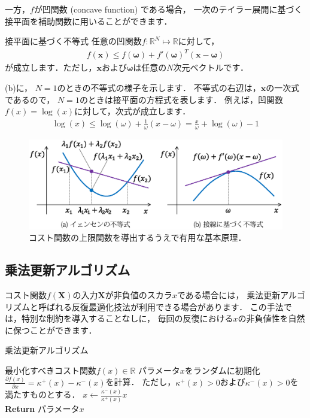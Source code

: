 一方，$f$が凹関数 (concave function) である場合，
一次のテイラー展開に基づく接平面を補助関数に用いることができます．
\begin{theobox}{接平面に基づく不等式}
\label{jensen}
任意の凹関数$f:\mathbb{R}^N \mapsto \mathbb{R}$に対して，
\begin{align}
f(\bm{x}) \le f(\bm\omega) + f'(\bm\omega)^T(\bm{x} - \bm\omega)
\end{align}
が成立します．ただし，$\bm{x}$および$\bm\omega$は任意の$N$次元ベクトルです．\\[-4mm]
\end{theobox}
(b)に，
$N=1$のときの不等式の様子を示します．
不等式の右辺は，$\bm{x}$の一次式であるので，
$N=1$のときは接平面の方程式を表します．
例えば，凹関数$f(x) = \log (x)$に対して，次式が成立します．
\begin{align}
\log(x) \le \log(\omega) + \frac{1}{\omega}(x - \omega) = \frac{x}{\omega} + \log(\omega) - 1
\end{align}

\begin{figure}[t]
\centering
\includegraphics[width=.98\linewidth]{sections/optimization/aux_function_conv_concave}
\vspace{-2mm}
\caption{コスト関数の上限関数を導出するうえで有用な基本原理．}
\label{fig:aux_function_conv_concave}
\end{figure}

\subsection{乗法更新アルゴリズム}
\label{sec:multiplicative_update}

コスト関数$f(\bm{X})$の入力$\bm{X}$が非負値のスカラ$x$である場合には，
乗法更新アルゴリズムと呼ばれる反復最適化技法が利用できる場合があります．
この手法では，特別な制約を導入することなしに，
毎回の反復における$x$の非負値性を自然に保つことができます．

\begin{algobox}{乗法更新アルゴリズム}
\label{algo:multiplicative_update}
\begin{algorithmic}[1]
\Require 最小化すべきコスト関数$f(x) \in \mathbb{R}$
\State パラメータ$x$をランダムに初期化
\State $\frac{\partial f(x)}{\partial x} = \kappa^+(x) - \kappa^-(x)$を計算．
ただし，$\kappa^+(x) > 0$および$\kappa^-(x) > 0$を満たすものとする．
\State $x \gets \frac{\kappa^-(x)}{\kappa^+(x)} x$
\EndWhile\\
{\bf Return} パラメータ$x$
\end{algorithmic}
\end{algobox}

